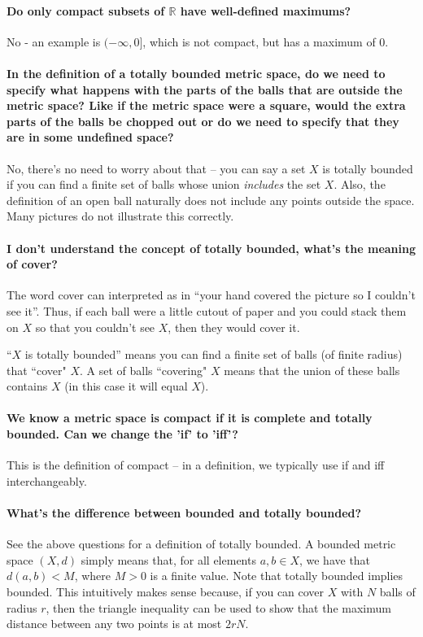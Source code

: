 \documentclass[10pt,english]{article}
\begin{document}
\paragraph{Do only compact subsets of $\mathbb{R}$ have well-defined maximums?}
No - an example is $(-\infty,0]$, which is not compact, but has a maximum of 0.


\paragraph{In the definition of a totally bounded metric space, do we need to specify what happens with the parts of the balls that are outside the metric space? Like if the metric space were a square, would the extra parts of the balls be chopped out or do we need to specify that they are in some undefined space?}

No, there's no need to worry about that -- you can say a set $X$ is totally bounded if you can find a finite set of balls whose union \textit{includes} the set $X$.
Also, the definition of an open ball naturally does not include any points outside the space.
Many pictures do not illustrate this correctly.





\paragraph{I don't understand the concept of totally bounded, what's the meaning of cover?}

The word cover can interpreted as in ``your hand covered the picture so I couldn't see it''.
Thus, if each ball were a little cutout of paper and you could stack them on $X$ so that you couldn't see $X$, then they would cover it.

``$X$ is totally bounded'' means you can find a finite set of balls (of finite radius) that ``cover" $X$.
A set of balls ``covering" $X$ means that the union of these balls contains $X$ (in this case it will equal $X$).

\paragraph{We know a metric space is compact if it is complete and totally bounded. Can we change the 'if' to 'iff'?}
This is the definition of compact -- in a definition, we typically use if and iff interchangeably.


\paragraph{What's the difference between bounded and totally bounded?}
See the above questions for a definition of totally bounded.
A bounded metric space $(X,d)$ simply means that, for all elements $a,b \in X$, we have that $d(a,b)<M$, where $M>0$ is a finite value.
Note that totally bounded implies bounded.
This intuitively makes sense because, if you can cover $X$ with $N$ balls of radius $r$, then the triangle inequality can be used to show that the maximum distance between any two points is at most $2rN$.
\end{document}
